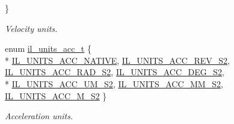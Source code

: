 \begin{DoxyCompactItemize}
 \}\begin{DoxyCompactList}\small\item\em Velocity units. \end{DoxyCompactList}
\item 
enum \hyperlink{group__IL__SERVO_ga07f4e0f292d1d7b5a6f1fc5c35fc151f}{il\+\_\+units\+\_\+acc\+\_\+t} \{ \\*
\hyperlink{group__IL__SERVO_gga07f4e0f292d1d7b5a6f1fc5c35fc151fa2dbb4edbf87bf40d1bec4e6b819570e5}{I\+L\+\_\+\+U\+N\+I\+T\+S\+\_\+\+A\+C\+C\+\_\+\+N\+A\+T\+I\+VE}, 
\hyperlink{group__IL__SERVO_gga07f4e0f292d1d7b5a6f1fc5c35fc151fa8fef1361fab6dab1481859efbb3b1c48}{I\+L\+\_\+\+U\+N\+I\+T\+S\+\_\+\+A\+C\+C\+\_\+\+R\+E\+V\+\_\+\+S2}, 
\hyperlink{group__IL__SERVO_gga07f4e0f292d1d7b5a6f1fc5c35fc151fadb4738643811868f758c9297c1199c70}{I\+L\+\_\+\+U\+N\+I\+T\+S\+\_\+\+A\+C\+C\+\_\+\+R\+A\+D\+\_\+\+S2}, 
\hyperlink{group__IL__SERVO_gga07f4e0f292d1d7b5a6f1fc5c35fc151fa9140fe3bc3c29c442a2af102f43abb77}{I\+L\+\_\+\+U\+N\+I\+T\+S\+\_\+\+A\+C\+C\+\_\+\+D\+E\+G\+\_\+\+S2}, 
\\*
\hyperlink{group__IL__SERVO_gga07f4e0f292d1d7b5a6f1fc5c35fc151fab6ee667f66aaae98136b1bae969467f7}{I\+L\+\_\+\+U\+N\+I\+T\+S\+\_\+\+A\+C\+C\+\_\+\+U\+M\+\_\+\+S2}, 
\hyperlink{group__IL__SERVO_gga07f4e0f292d1d7b5a6f1fc5c35fc151fa1cf13cf16f774312a603493c2e9961e4}{I\+L\+\_\+\+U\+N\+I\+T\+S\+\_\+\+A\+C\+C\+\_\+\+M\+M\+\_\+\+S2}, 
\hyperlink{group__IL__SERVO_gga07f4e0f292d1d7b5a6f1fc5c35fc151fa4de34cd9765e5671b419237519d33ec9}{I\+L\+\_\+\+U\+N\+I\+T\+S\+\_\+\+A\+C\+C\+\_\+\+M\+\_\+\+S2}
 \}\begin{DoxyCompactList}\small\item\em Acceleration units. \end{DoxyCompactList}
\end{DoxyCompactItemize}
